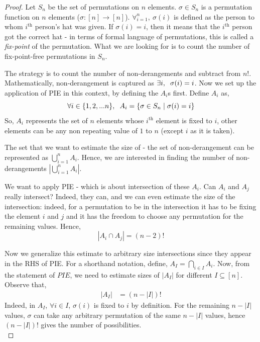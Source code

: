 \begin{proof}
Let $S_n$ be the set of permutations on $n$ elements. $\sigma \in S_n$ is a permutation function on $n$  elements ($\sigma : [n] \rightarrow [n]$). $\forall_{i=1}^{n},~ \sigma(i)$ is defined as the person to whom $i^{\text{th}}$ person's hat was given. If $\sigma(i) = i$, then it means that the $i^{\text{th}}$ person got the correct hat - in terms of formal language of permutations, this is called a \textit{fix-point} of the permutation. What we are looking for is to count the number of fix-point-free permutations in $S_n$. 


The strategy is to count the number of non-derangements and subtract from $n!$.
Mathematically, non-derangement is captured as $\exists i,\hspace{0.2cm} \sigma(i) = i$. Now we set up the application of PIE in this context, by defining the $A_i$s first. Define $A_i$ as, 
$$\forall i \in \{1,2,...n\},\hspace{0.2cm} A_i = \{\sigma \in S_n\hspace{0.1cm} |\hspace{0.1cm} \sigma(i) = i\}$$ 
So, $A_i$ represents the set of $n$ elements whose $i^{\text{th}}$ element is fixed to $i$, other elements can be any non repeating value of $1$ to $n$ (except $i$ as it is taken).

The set that we want to estimate the size of - the set of non-derangement can be represented as $\bigcup_{i=1}^{n} A_i$.
Hence, we are interested in finding the number of non-derangements $|\bigcup_{i=1}^{n} A_i|$.

We want to apply PIE - which is about intersection of these $A_i$. Can $A_i$ and $A_j$ really intersect? Indeed, they can, and we can even estimate the size of the intersection: indeed, for a permutation to be in the intersection it has to be fixing the element $i$ and $j$ and it has the freedom to choose any permutation for the remaining values. Hence,
$$|A_i \cap A_j| = (n-2)!$$

Now we generalize this estimate to arbitrary size intersections since they appear in the RHS of PIE. For a shorthand notation, define, $A_I = \bigcap_{i \in I} A_i$. Now, from the statement of $PIE$, we need to estimate sizes of $\left| A_I \right|$ for different $I \subseteq [n]$. Observe that,
\begin{align}
|A_I| &= (n-|I|)! \label{eq:size_of_A_I_derangement_problem}
\end{align}
Indeed, in $A_I$, $\forall i \in I$, $\sigma(i)$ is fixed to $i$ by definition. For the remaining $n-|I|$ values, $\sigma$ can take any arbitrary permutation of the same $n-|I|$ values, hence $(n-|I|)!$ gives the number of possibilities.\\


\end{proof}
